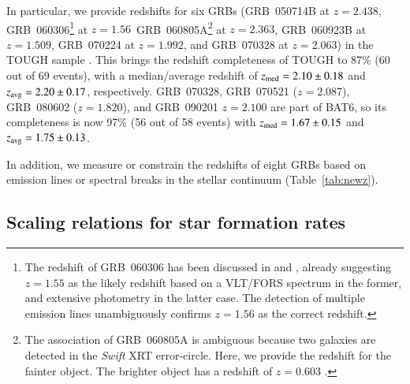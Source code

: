 \documentclass[traditabstract, longauth]{aa}
\begin{document}
In particular, we provide redshifts for six GRBs (GRB~050714B at $z=2.438$, GRB~060306\footnote{The redshift of GRB~060306 has been discussed in \citet{2012ApJ...752...62J} and \citet{2013ApJ...778..128P}, already suggesting $z=1.55$ as the likely redshift based on a VLT/FORS spectrum in the former, and extensive photometry in the latter case. The detection of multiple emission lines unambiguously confirms $z=1.56$ as the correct redshift.} at $z=1.56$\, GRB~060805A\footnote{The association of GRB~060805A is ambiguous because two galaxies are detected in the \textit{Swift} XRT error-circle. Here, we provide the redshift for the fainter object. The brighter object has a redshift of $z=0.603$ \citep{2012ApJ...752...62J}.} at $z=2.363$, GRB~060923B at $z=1.509$, GRB~070224 at $z=1.992$, and GRB~070328 at $z=2.063$) in the TOUGH sample \citep{2012ApJ...756..187H}. This brings the redshift completeness of TOUGH to 87\% (60 out of 69 events), with a median/average redshift of $z_{\rm{med}} = 2.10\pm0.18$ and $z_{\rm{avg}}= 2.20\pm0.17$, respectively. GRB~070328, GRB~070521 ($z=2.087$), GRB~080602 ($z=1.820$), and GRB~090201 $z=2.100$ are part of BAT6, so its completeness is now 97\% (56 out of 58 events) with $z_{\rm{med}} = 1.67\pm0.15$ and $z_{\rm{avg}}= 1.75\pm0.13$.

In addition, we measure or constrain the redshifts of eight GRBs based on emission lines or spectral breaks in the stellar continuum  (Table~\ref{tab:newz}). 



\subsection{Scaling relations for star formation rates}
\label{sec:newsc}
\end{document}
